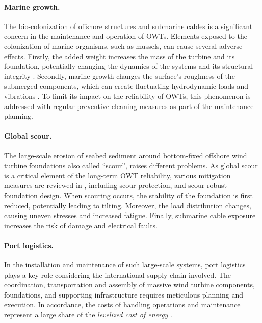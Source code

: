 

\paragraph{Marine growth.}
The bio-colonization of offshore structures and submarine cables is a significant concern in the maintenance and operation of OWTs. 
Elements exposed to the colonization of marine organisms, such as mussels, can cause several adverse effects. 
Firstly, the added weight increases the mass of the turbine and its foundation, potentially changing the dynamics of the systems and its structural integrity \citep{ameryoun_2019_marine_growth,schoefs_2022_reliability_marine_growth}. 
Secondly, marine growth changes the surface's roughness of the submerged components, which can create fluctuating hydrodynamic loads and vibrations \citep{marty_2021_cable_marine_growth}. 
To limit its impact on the reliability of OWTs, this phenomenon is addressed with regular preventive cleaning measures as part of the maintenance planning. 


\paragraph{Global scour.}
The large-scale erosion of seabed sediment around bottom-fixed offshore wind turbine foundations also called ``scour'', raises different problems. 
As global scour is a critical element of the long-term OWT reliability, various mitigation measures are reviewed in \citet{fazeres_2021_scour}, including scour protection, and scour-robust foundation design.
When scouring occurs, the stability of the foundation is first reduced, potentially leading to tilting. 
Moreover, the load distribution changes, causing uneven stresses and increased fatigue. 
Finally, submarine cable exposure increases the risk of damage and electrical faults. 


\paragraph{Port logistics.}
In the installation and maintenance of such large-scale systems, port logistics plays a key role considering the international supply chain involved. 
The coordination, transportation and assembly of massive wind turbine components, foundations, and supporting infrastructure requires meticulous planning and execution. 
In accordance, the costs of handling operations and maintenance represent a large share of the \textit{levelized cost of energy} \citep{shields_2021_owt_lcoe}.  

